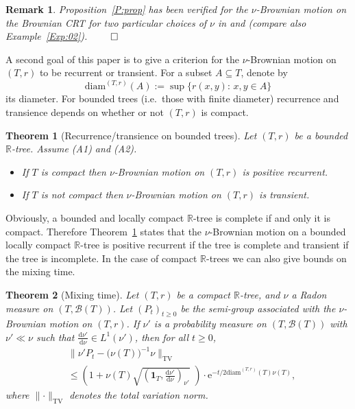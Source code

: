 \documentclass[11pt]{amsart}
\numberwithin{equation}{section}
\newtheorem{theorem}{Theorem}
\newtheorem{remark}[definition]{Remark}
\begin{document}
\begin{remark}\rm
Proposition~\ref{P:prop} has been verified for the $\nu$-Brownian motion on the Brownian CRT for two particular choices of $\nu$ in \cite{Kre95} and \cite{Cro08}
(compare also Example~\ref{Exp:02}).
\hfill$\qed$
\label{Rem:04}
\end{remark}{\smallskip}

A second goal of this paper is to give a criterion for the $\nu$-Brownian motion on $(T,r)$ to be recurrent or transient. For a subset $A\subseteq T$, denote by
\begin{equation}\label{e:diam}
    \mathrm{diam}^{(T,r)}(A)
 :=
    \sup\big\{r(x,y):\,x,y\in A\big\}
\end{equation}
its diameter. For bounded trees (i.e.\ those with finite diameter) recurrence and transience depends on whether or not $(T,r)$ is compact.
\begin{theorem}[Recurrence/transience on bounded trees] Let $(T,r)$ be a  bounded ${{\mathbb R}}$-tree. Assume (A1) and (A2).
 \begin{itemize}
 \item[(i)] If $T$ is compact then $\nu$-Brownian motion on $(T,r)$ is positive recurrent.
 \item[(ii)] If $T$ is not compact then $\nu$-Brownian motion on $(T,r)$ is transient.
 \end{itemize}
\label{T:04}
\end{theorem}{\smallskip}

Obviously, a bounded { and locally compact} ${{\mathbb R}}$-tree is complete if and only it is compact. Therefore {Theorem~\ref{T:04} states} that the $\nu$-Brownian motion on a bounded locally compact ${{\mathbb R}}$-tree is positive recurrent if the tree is complete and transient if the tree is incomplete.
In the case of compact ${{\mathbb R}}$-trees we can also give bounds on the mixing time.

\begin{theorem}[Mixing time] {Let $(T,r)$ be a compact ${{\mathbb R}}$-tree, and $\nu$ a Radon measure on $(T,{\mathcal B}(T))$.} Let {$(P_t)_{t\ge 0}$}  be the semi-group associated with {the} $\nu$-Brownian motion on $(T,r)$.
\label{C:mix}
If $\nu'$ is a probability measure on $(T,{\mathcal B}(T))$ with $\nu'\ll\nu$ such that
$\tfrac{\mathrm d\nu'}{\mathrm d\nu}\in L^1(\nu')$, then for all $t{\ge} 0$,
\begin{equation}\label{e:mix.1}
\begin{aligned}
   &\big\|\nu'P_t-\big(\nu(T)\big)^{-1}\nu\big\|_{\mathrm{TV}}
  \\
 &\leq
   \left(1+\nu(T)\sqrt{(\mathbf{1}_T,\tfrac{\mathrm d\nu'}{\mathrm d\nu})_{\nu'}} \,\,\right)\cdot\mathrm e^{-t/2\mathrm{diam}^{(T,r)}(T)\nu(T)},
\end{aligned}
\end{equation}
where $\|\boldsymbol{\cdot}\|_{\mathrm{TV}}$ denotes the total variation norm.
\end{theorem}{\smallskip}
\end{document}
